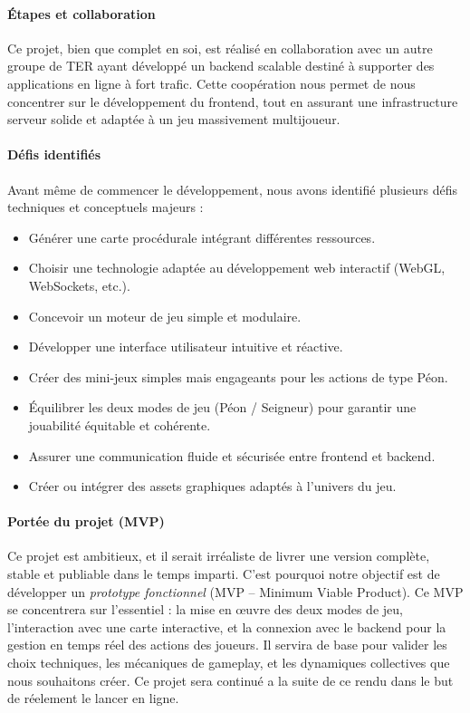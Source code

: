 \paragraph{Étapes et collaboration}
Ce projet, bien que complet en soi, est réalisé en collaboration avec un autre groupe de TER ayant développé un backend scalable destiné à supporter des applications en ligne à fort trafic. Cette coopération nous permet de nous concentrer sur le développement du frontend, tout en assurant une infrastructure serveur solide et adaptée à un jeu massivement multijoueur.

\paragraph{Défis identifiés}
Avant même de commencer le développement, nous avons identifié plusieurs défis techniques et conceptuels majeurs :
\begin{itemize}
    \item Générer une carte procédurale intégrant différentes ressources.
    \item Choisir une technologie adaptée au développement web interactif (WebGL, WebSockets, etc.).
    \item Concevoir un moteur de jeu simple et modulaire.
    \item Développer une interface utilisateur intuitive et réactive.
    \item Créer des mini-jeux simples mais engageants pour les actions de type Péon.
    \item Équilibrer les deux modes de jeu (Péon / Seigneur) pour garantir une jouabilité équitable et cohérente.
    \item Assurer une communication fluide et sécurisée entre frontend et backend.
    \item Créer ou intégrer des assets graphiques adaptés à l’univers du jeu.
\end{itemize}

\paragraph{Portée du projet (MVP)}
Ce projet est ambitieux, et il serait irréaliste de livrer une version complète, stable et publiable dans le temps imparti. C’est pourquoi notre objectif est de développer un \textit{prototype fonctionnel} (MVP – Minimum Viable Product). Ce MVP se concentrera sur l’essentiel : la mise en œuvre des deux modes de jeu, l’interaction avec une carte interactive, et la connexion avec le backend pour la gestion en temps réel des actions des joueurs. Il servira de base pour valider les choix techniques, les mécaniques de gameplay, et les dynamiques collectives que nous souhaitons créer. Ce projet sera continué a la suite de ce rendu dans le but de réelement le lancer en ligne.

